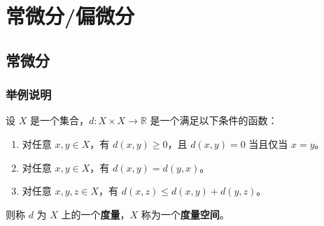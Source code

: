 \documentclass[12pt, a4paper, oneside, UTF8]{ctexbook}
\begin{document}
	\else
	\fi
	\part{常微分/偏微分}
	\chapter{常微分}
	
	\section{举例说明}
	
	\begin{defn}
		设 $X$ 是一个集合，$d: X \times X \to \mathbb{R}$ 是一个满足以下条件的函数：
		\begin{enumerate}
			\item 对任意 $x, y \in X$，有 $d(x, y) \geq 0$，且 $d(x, y) = 0$ 当且仅当 $x = y$。
			\item 对任意 $x, y \in X$，有 $d(x, y) = d(y, x)$。
			\item 对任意 $x, y, z \in X$，有 $d(x, z) \leq d(x, y) + d(y, z)$。
		\end{enumerate}
		则称 $d$ 为 $X$ 上的一个\textbf{度量}，$X$ 称为一个\textbf{度量空间}。
	\end{defn}
	
	\ifx\allfiles\undefined
\end{document}
